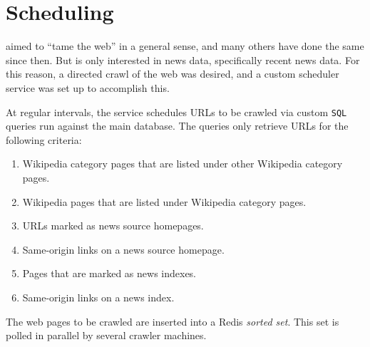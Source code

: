\section{Scheduling}

 aimed to ``tame the web'' in
a general sense, and many others have done the same since then.
But \nr{} is only interested in news data, specifically
recent news data.  For this reason, a directed crawl of the web
was desired, and a custom scheduler service was set up to
accomplish this.

At regular intervals, the service schedules URLs to be crawled via
custom {\tt SQL} queries run against the main database.  The
queries only retrieve URLs for the following criteria:

\begin{enumerate}
    \item Wikipedia category pages that are listed under other Wikipedia
          category pages.
    \item Wikipedia pages that are listed under Wikipedia category pages.
    \item URLs marked as news source homepages.
    \item Same-origin links on a news source homepage.
    \item Pages that are marked as news indexes.
    \item Same-origin links on a news index.
\end{enumerate}

The web pages to be crawled are inserted into a Redis
{\it sorted set}.  This set is polled in parallel by several
crawler machines.
